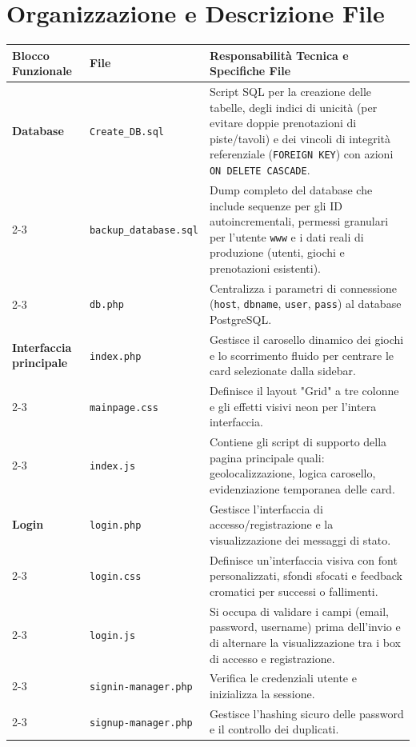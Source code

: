 \documentclass[a4paper, twoside]{report}
\begin{document}
\section{Organizzazione e Descrizione File}
\renewcommand{\arraystretch}{1.5}
\begin{tabularx}{\textwidth}{|l|X|X|}
\hline
\rowcolor{lightgray} \textbf{Blocco Funzionale} & \textbf{File} & \textbf{Responsabilità Tecnica e Specifiche File} \\ \hline
\cellcolor{pink} \textbf{Database} & \texttt{Create\_DB.sql} & Script SQL per la creazione delle tabelle, degli indici di unicità (per evitare doppie prenotazioni di piste/tavoli) e dei vincoli di integrità referenziale (\texttt{FOREIGN KEY}) con azioni \texttt{ON DELETE CASCADE}. \\ \cline{2-3}
\cellcolor{pink} & \texttt{backup\_database.sql} & Dump completo del database che include sequenze per gli ID autoincrementali, permessi granulari per l'utente \texttt{www} e i dati reali di produzione (utenti, giochi e prenotazioni esistenti). \\ \cline{2-3}
\cellcolor{pink} & \texttt{db.php} & Centralizza i parametri di connessione (\texttt{host}, \texttt{dbname}, \texttt{user}, \texttt{pass}) al database PostgreSQL. \\ \hline

\cellcolor{cyan!50!white} \textbf{Interfaccia principale} & \texttt{index.php} & Gestisce il carosello dinamico dei giochi e lo scorrimento fluido per centrare le card selezionate dalla sidebar. \\ \cline{2-3}
\cellcolor{cyan!50!white} & \texttt{mainpage.css} & Definisce il layout "Grid" a tre colonne e gli effetti visivi neon per l'intera interfaccia. \\ \cline{2-3}
\cellcolor{cyan!50!white} & \texttt{index.js} & Contiene gli script di supporto della pagina principale quali: geolocalizzazione, logica carosello, evidenziazione temporanea delle card. \\ \hline

\cellcolor{ForestGreen!50!white} \textbf{Login} & \texttt{login.php} & Gestisce l'interfaccia di accesso/registrazione e la visualizzazione dei messaggi di stato. \\ \cline{2-3}
\cellcolor{ForestGreen!50!white} & \texttt{login.css} & Definisce un'interfaccia visiva con font personalizzati, sfondi sfocati  e feedback cromatici per successi o fallimenti. \\ \cline{2-3}
\cellcolor{ForestGreen!50!white} & \texttt{login.js} & Si occupa di validare i campi (email, password, username) prima dell'invio e di alternare la visualizzazione tra i box di accesso e registrazione. \\ \cline{2-3}
\cellcolor{ForestGreen!50!white} & \texttt{signin-manager.php} & Verifica le credenziali utente e inizializza la sessione. \\ \cline{2-3}
\cellcolor{ForestGreen!50!white} & \texttt{signup-manager.php} & Gestisce l'hashing sicuro delle password e il controllo dei duplicati. \\ \hline


\end{tabularx}
\end{document}
